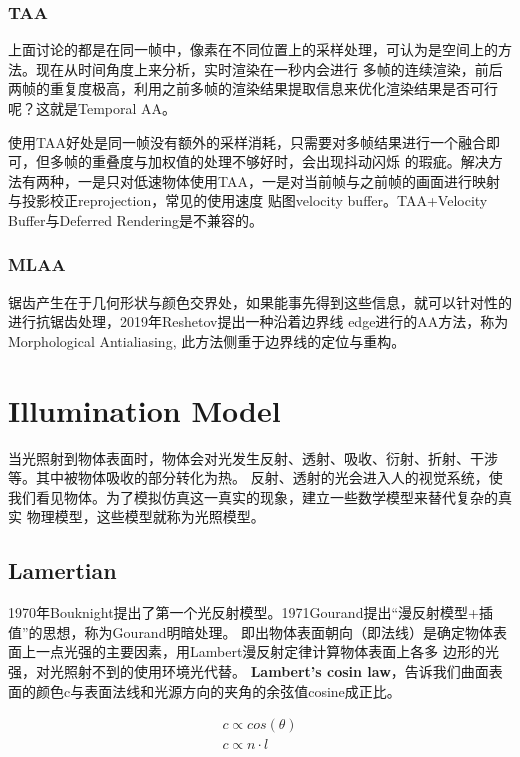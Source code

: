 \subsection{TAA}

上面讨论的都是在同一帧中，像素在不同位置上的采样处理，可认为是空间上的方法。现在从时间角度上来分析，实时渲染在一秒内会进行
多帧的连续渲染，前后两帧的重复度极高，利用之前多帧的渲染结果提取信息来优化渲染结果是否可行呢？这就是Temporal AA。 

使用TAA好处是同一帧没有额外的采样消耗，只需要对多帧结果进行一个融合即可，但多帧的重叠度与加权值的处理不够好时，会出现抖动闪烁
的瑕疵。解决方法有两种，一是只对低速物体使用TAA，一是对当前帧与之前帧的画面进行映射与投影校正reprojection，常见的使用速度
贴图velocity buffer。TAA+Velocity Buffer与Deferred Rendering是不兼容的。

\subsection{MLAA}

锯齿产生在于几何形状与颜色交界处，如果能事先得到这些信息，就可以针对性的进行抗锯齿处理，2019年Reshetov提出一种沿着边界线
edge进行的AA方法，称为Morphological Antialiasing, 此方法侧重于边界线的定位与重构。


\chapter{Illumination Model}

当光照射到物体表面时，物体会对光发生反射、透射、吸收、衍射、折射、干涉等。其中被物体吸收的部分转化为热。
反射、透射的光会进入人的视觉系统，使我们看见物体。为了模拟仿真这一真实的现象，建立一些数学模型来替代复杂的真实
物理模型，这些模型就称为光照模型。

\section{Lamertian}
1970年Bouknight提出了第一个光反射模型。1971Gourand提出“漫反射模型+插值”的思想，称为Gourand明暗处理。
即出物体表面朝向（即法线）是确定物体表面上一点光强的主要因素，用Lambert漫反射定律计算物体表面上各多
边形的光强，对光照射不到的使用环境光代替。
\textbf{Lambert's cosin law}，告诉我们曲面表面的颜色c与表面法线和光源方向的夹角的余弦值cosine成正比。

\begin{align*}
c \propto cos(\theta) \\
c \propto n \cdot l 
\end{align*}

